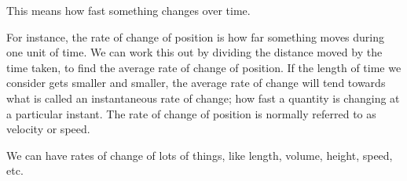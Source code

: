 This means how fast something changes over time.
\par
For instance, the rate of change of position is how far something moves 
during one unit of time. We can work this out by dividing the distance moved 
by the time taken, to find the average rate of change of position. If the 
length of time we consider gets smaller and smaller, the average rate of
change will tend towards what is called an instantaneous rate of change; how
fast a quantity is changing at a particular instant. The rate of change of position is normally referred to as velocity or speed.
\par
We can have rates of change of lots of things, like length, volume, height,
speed, etc.